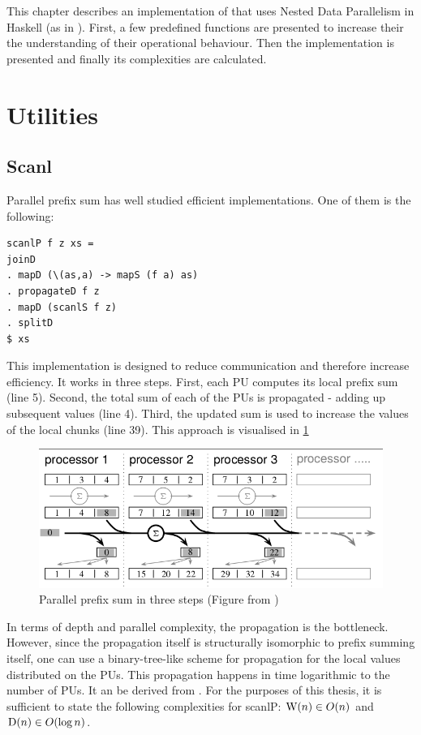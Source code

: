 \label{chapter:ndpn}

This chapter describes an implementation of \algo that uses
Nested Data Parallelism in Haskell (as in \cite{Harness2008}).
First, a few predefined functions are presented to
increase their the understanding of their operational behaviour.
Then the implementation is presented
and finally its complexities are calculated.

\section{Utilities}

  \subsection{Scanl}
    Parallel prefix sum has well studied efficient implementations.
    One of them is the following:
    \begin{lstlisting}   
scanlP f z xs =
joinD
. mapD (\(as,a) -> mapS (f a) as)
. propagateD f z
. mapD (scanlS f z)
. splitD
$ xs
    \end{lstlisting}
    This implementation is designed to reduce communication
    and therefore increase efficiency. It works in three steps.
    First, each PU computes its local prefix sum (line 5).
    Second, the total sum of each of the PUs is propagated
    - adding up subsequent values (line 4).
    Third, the updated sum is used to increase the values of the local chunks (line 39).
    This approach is visualised in \ref{figure:scanlPsteps}
    
    \begin{figure}[h!]
        \includegraphics[width=\linewidth]{scanlP-three-steps.png}
        \caption{Parallel prefix sum in three steps (Figure from \cite{DistTypes1999}) }
        \label{figure:scanlPsteps}
    \end{figure}
    In terms of depth and parallel complexity, the propagation is the bottleneck.
    However, since the propagation itself is structurally isomorphic to prefix summing itself,
    one can use a binary-tree-like scheme for propagation for the local values distributed on the PUs.
    This propagation happens in time logarithmic to the number of PUs.
    It an be derived from \cite{Scanl1980}. For the purposes of this thesis,
    it is sufficient to state the following complexities for scanlP:
    $\textrm{W}(n) \in O(n)$ and $\textrm{D}(n) \in O(\log n)$.

